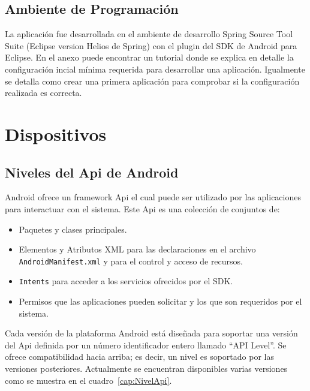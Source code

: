 \documentclass[letterpaper,12pt]{book}
\begin{document}
\begin{mainmatter}
\subsection{Ambiente de Programación}

La  aplicación fue desarrollada  en el  ambiente de  desarrollo Spring
Source Tool Suite (Eclipse version Helios de Spring)  con el plugin del 
SDK de Android para Eclipse. En el anexo puede encontrar un tutorial
donde se explica en detalle la configuración incial mínima requerida para
desarrollar una aplicación. Igualmente se detalla como crear una primera 
aplicación para comprobar si la configuración realizada es correcta.


\section{Dispositivos}


\subsection{Niveles del Api de Android}

Android ofrece  un framework Api el  cual puede ser  utilizado por las
aplicaciones para interactuar con el sistema. Este Api es una colección de conjuntos de: 
\begin{itemize}
\item Paquetes  y clases  principales.
\item Elementos y  Atributos  XML para  las
declaraciones en  el archivo  \texttt{AndroidManifest.xml} y para  el control y  acceso de
recursos.  

\item \texttt{Intents} para acceder a los servicios ofrecidos por el SDK.   

\item Permisos que las aplicaciones pueden
solicitar y los que son requeridos por el sistema.
\end{itemize}


Cada versión de la plataforma  Android está diseñada para soportar una
versión del  Api definida por  un número identificador  entero llamado
``API  Level''.  Se ofrece compatibilidad hacia arriba; es decir, un nivel es soportado por las
versiones  posteriores.   Actualmente  se encuentran  disponibles  varias
versiones como se muestra en el cuadro~\ref{cap:NivelApi}.


\begin{table}[t]


\end{table}
\end{mainmatter}
\end{document}
